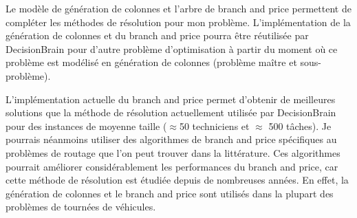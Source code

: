\documentclass[]{report}
\begin{document}
Le modèle de génération de colonnes et l'arbre de branch and price permettent de compléter les méthodes de résolution pour mon problème.
L'implémentation de la génération de colonnes et du branch and price pourra être réutilisée par DecisionBrain pour d'autre problème d'optimisation à partir du moment où ce problème est modélisé en génération de colonnes (problème maître
et sous-problème).

L'implémentation actuelle du branch and price permet d'obtenir de meilleures solutions que la méthode de résolution actuellement utilisée par DecisionBrain pour des instances de moyenne taille ($\approx $50 techniciens et $\approx$ 500 tâches).
Je pourrais néanmoins utiliser des algorithmes de branch and price spécifiques au problèmes de routage que l'on peut trouver dans la littérature.
Ces algorithmes pourrait améliorer considérablement les performances du branch and price, car cette méthode de résolution est étudiée depuis de nombreuses années.
En effet, la génération de colonnes et le branch and price sont utilisés dans la plupart des problèmes de tournées de véhicules.
\end{document}
